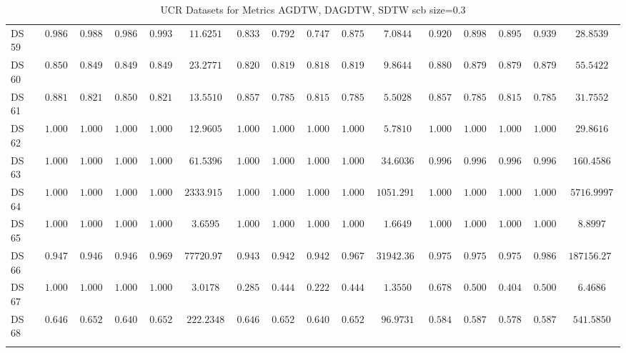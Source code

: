 {\begin{longtable}{|l|ccccc|ccccc|ccccc|}
		DS 59 & $\boldsymbol{0.9867}$ & $\boldsymbol{0.9886}$ & $\boldsymbol{0.9866}$ & $\boldsymbol{0.9932}$ & $11.6251$ & $0.8333$ & $0.7929$ & $0.7470$ & $0.8758$ & $7.0844$ & $0.9200$ & $0.8983$ & $0.8957$ & $0.9390$ & $28.8539$ \\
		DS 60 & $0.8507$ & $0.8498$ & $0.8499$ & $0.8498$ & $23.2771$ & $0.8209$ & $0.8195$ & $0.8189$ & $0.8195$ & $9.8644$ & $\boldsymbol{0.8806}$ & $\boldsymbol{0.8792}$ & $\boldsymbol{0.8793}$ & $\boldsymbol{0.8792}$ & $55.5422$ \\
		DS 61 & $\boldsymbol{0.8810}$ & $\boldsymbol{0.8214}$ & $\boldsymbol{0.8503}$ & $\boldsymbol{0.8214}$ & $13.5510$ & $0.8571$ & $0.7857$ & $0.8152$ & $0.7857$ & $5.5028$ & $0.8571$ & $0.7857$ & $0.8152$ & $0.7857$ & $31.7552$ \\
		DS 62 & $1.0000$ & $1.0000$ & $1.0000$ & $1.0000$ & $12.9605$ & $1.0000$ & $1.0000$ & $1.0000$ & $1.0000$ & $5.7810$ & $\boldsymbol{1.0000}$ & $\boldsymbol{1.0000}$ & $\boldsymbol{1.0000}$ & $\boldsymbol{1.0000}$ & $29.8616$ \\
		DS 63 & $\boldsymbol{1.0000}$ & $\boldsymbol{1.0000}$ & $\boldsymbol{1.0000}$ & $\boldsymbol{1.0000}$ & $61.5396$ & $1.0000$ & $1.0000$ & $1.0000$ & $1.0000$ & $34.6036$ & $0.9966$ & $0.9966$ & $0.9966$ & $0.9966$ & $160.4586$ \\
		DS 64 & $1.0000$ & $1.0000$ & $1.0000$ & $1.0000$ & $2333.9152$ & $1.0000$ & $1.0000$ & $1.0000$ & $1.0000$ & $1051.2914$ & $\boldsymbol{1.0000}$ & $\boldsymbol{1.0000}$ & $\boldsymbol{1.0000}$ & $\boldsymbol{1.0000}$ & $5716.9997$ \\
		DS 65 & $1.0000$ & $1.0000$ & $1.0000$ & $1.0000$ & $3.6595$ & $1.0000$ & $1.0000$ & $1.0000$ & $1.0000$ & $1.6649$ & $\boldsymbol{1.0000}$ & $\boldsymbol{1.0000}$ & $\boldsymbol{1.0000}$ & $\boldsymbol{1.0000}$ & $8.8997$ \\
		DS 66 & $0.9473$ & $0.9461$ & $0.9460$ & $0.9692$ & $77720.9701$ & $0.9437$ & $0.9425$ & $0.9423$ & $0.9671$ & $31942.3678$ & $\boldsymbol{0.9759}$ & $\boldsymbol{0.9757}$ & $\boldsymbol{0.9759}$ & $\boldsymbol{0.9861}$ & $187156.2735$ \\
		DS 67 & $1.0000$ & $1.0000$ & $1.0000$ & $1.0000$ & $3.0178$ & $0.2857$ & $0.4444$ & $0.2222$ & $0.4444$ & $1.3550$ & $0.6786$ & $0.5000$ & $0.4043$ & $0.5000$ & $6.4686$ \\
		DS 68 & $\boldsymbol{0.6462}$ & $\boldsymbol{0.6525}$ & $\boldsymbol{0.6407}$ & $\boldsymbol{0.6525}$ & $222.2348$ & $0.6462$ & $0.6525$ & $0.6407$ & $0.6525$ & $96.9731$ & $0.5846$ & $0.5875$ & $0.5782$ & $0.5875$ & $541.5850$ \\
		\hline
		\caption{UCR Datasets for Metrics AGDTW, DAGDTW, SDTW \gls{scb} size=0.3}
		\label{tab:UCR_agdtw-dagdtw-sdtw_scb_size=0.3}
	\end{longtable}
}
